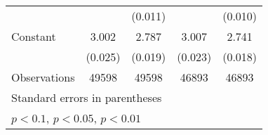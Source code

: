 {\begin{tabular}{l*{4}{c}}
                    &                     &     (0.011)         &                     &     (0.010)         \\
Constant            &       3.002\sym{***}&       2.787\sym{***}&       3.007\sym{***}&       2.741\sym{***}\\
                    &     (0.025)         &     (0.019)         &     (0.023)         &     (0.018)         \\
\hline
Observations        &       49598         &       49598         &       46893         &       46893         \\
\hline\hline
\multicolumn{5}{l}{\footnotesize Standard errors in parentheses}\\
\multicolumn{5}{l}{\footnotesize \sym{*} \(p<0.1\), \sym{**} \(p<0.05\), \sym{***} \(p<0.01\)}\\
\end{tabular}
}

